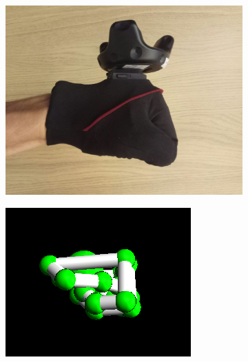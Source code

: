 \documentclass[hyperref, bachelorofscience]{cgvpub}
\begin{document}
\begin{figure}[b!]
\begin{subfigure}{.235\linewidth}
		\includegraphics[width=\linewidth]{../pics/hand_radial_ball}
	\end{subfigure}
	\hspace{.01cm}
	\begin{subfigure}{.235\linewidth}
		\includegraphics[width=\linewidth]{../pics/model_radial_ball}
	\end{subfigure}
	\hfill
	\begin{subfigure}{.235\linewidth}

\end{subfigure}
\end{figure}
\end{document}
